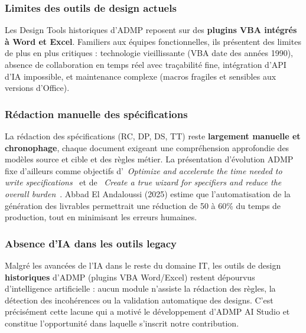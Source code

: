 \subsubsection{Limites des outils de design actuels}
\label{subsubsec:limites-design}

Les Design Tools historiques d'ADMP reposent sur des \textbf{plugins VBA
intégrés à Word et Excel}. Familiers aux équipes fonctionnelles, ils présentent
des limites de plus en plus critiques : technologie vieillissante (VBA date des
années 1990), absence de collaboration en temps réel avec traçabilité fine,
intégration d'API d'IA impossible, et maintenance complexe (macros fragiles et
sensibles aux versions d'Office).

\subsubsection{Rédaction manuelle des spécifications}
\label{subsubsec:redaction-manuelle}

La rédaction des spécifications (RC, DP, DS, TT) reste \textbf{largement
manuelle et chronophage}, chaque document exigeant une compréhension approfondie
des modèles source et cible et des règles métier. La présentation d'évolution
ADMP fixe d'ailleurs comme objectifs d'\og~\textit{Optimize and accelerate the
time needed to write specifications}~\fg{} et de \og~\textit{Create a true
wizard for specifiers and reduce the overall burden}~\fg{}. Abbad El Andaloussi
(2025) estime que l'automatisation de la génération des livrables permettrait
une réduction de 50 à 60\% du temps de production, tout en minimisant les
erreurs humaines.

\subsubsection{Absence d'IA dans les outils legacy}
\label{subsubsec:absence-ia}

Malgré les avancées de l'IA dans le reste du domaine IT, les outils de design
\textbf{historiques} d'ADMP (plugins VBA Word/Excel) restent dépourvus
d'intelligence artificielle : aucun module n'assiste la rédaction des règles,
la détection des incohérences ou la validation automatique des designs. C'est
précisément cette lacune qui a motivé le développement d'ADMP AI Studio et
constitue l'opportunité dans laquelle s'inscrit notre contribution.

